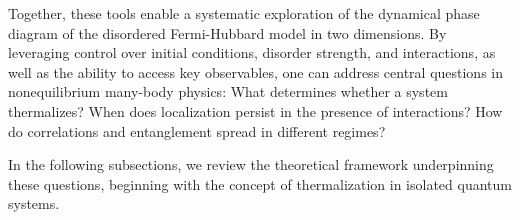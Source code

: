 Together, these tools enable a systematic exploration of the dynamical phase diagram of the disordered Fermi-Hubbard model in two dimensions. By leveraging control over initial conditions, disorder strength, and interactions, as well as the ability to access key observables, one can address central questions in nonequilibrium many-body physics: What determines whether a system thermalizes? When does localization persist in the presence of interactions? How do correlations and entanglement spread in different regimes?

In the following subsections, we review the theoretical framework underpinning these questions, beginning with the concept of thermalization in isolated quantum systems.

